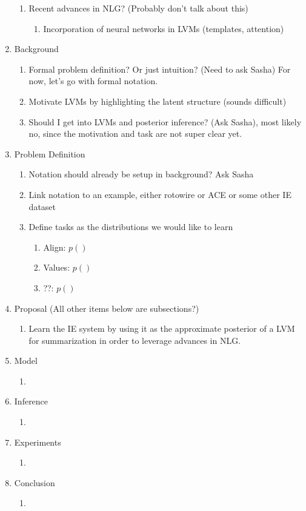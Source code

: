 \documentclass[11pt]{article}
\begin{document}
\begin{enumerate}
\begin{enumerate}
    \item Recent advances in NLG? (Probably don't talk about this)
        \begin{enumerate}
        \item Incorporation of neural networks in LVMs (templates, attention)
        \end{enumerate}
    \end{enumerate}
\item Background
    \begin{enumerate}
    \item Formal problem definition? Or just intuition? (Need to ask Sasha)
        For now, let's go with formal notation.
    \item Motivate LVMs by highlighting the latent structure (sounds difficult)
    \item Should I get into LVMs and posterior inference? (Ask Sasha),
        most likely no, since the motivation and task are not super clear yet.
    \end{enumerate}
\item Problem Definition
    \begin{enumerate}
    \item Notation should already be setup in background? Ask Sasha
    \item Link notation to an example, either rotowire or ACE or 
        some other IE dataset
    \item Define tasks as the distributions we would like to learn
        \begin{enumerate}
        \item Align: $p()$
        \item Values: $p()$
        \item ??: $p()$
        \end{enumerate}
    \end{enumerate}
\item Proposal (All other items below are subsections?)
    \begin{enumerate}
    \item Learn the IE system by using it as the approximate posterior
        of a LVM for summarization in order to leverage advances in NLG.
    \end{enumerate}
\item Model
    \begin{enumerate}
    \item 
    \end{enumerate}
\item Inference
    \begin{enumerate}
    \item 
    \end{enumerate}
\item Experiments
    \begin{enumerate}
    \item 
    \end{enumerate}
\item Conclusion
    \begin{enumerate}
    \item 
    \end{enumerate}
\end{enumerate}



\end{document}
